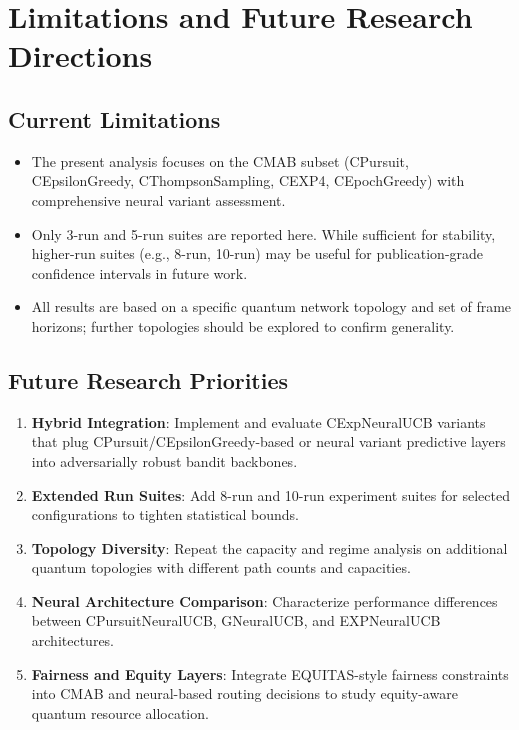 \documentclass[12pt,a4paper]{article}
\begin{document}
\section{Limitations and Future Research Directions}

\subsection{Current Limitations}

\begin{itemize}
\item The present analysis focuses on the CMAB subset (CPursuit, CEpsilonGreedy, CThompsonSampling, CEXP4, CEpochGreedy) with comprehensive neural variant assessment.
\item Only 3-run and 5-run suites are reported here. While sufficient for stability, higher-run suites (e.g., 8-run, 10-run) may be useful for publication-grade confidence intervals in future work.
\item All results are based on a specific quantum network topology and set of frame horizons; further topologies should be explored to confirm generality.
\end{itemize}

\subsection{Future Research Priorities}

\begin{enumerate}
\item \textbf{Hybrid Integration}: Implement and evaluate CExpNeuralUCB variants that plug CPursuit/CEpsilonGreedy-based or neural variant predictive layers into adversarially robust bandit backbones.
\item \textbf{Extended Run Suites}: Add 8-run and 10-run experiment suites for selected configurations to tighten statistical bounds.
\item \textbf{Topology Diversity}: Repeat the capacity and regime analysis on additional quantum topologies with different path counts and capacities.
\item \textbf{Neural Architecture Comparison}: Characterize performance differences between CPursuitNeuralUCB, GNeuralUCB, and EXPNeuralUCB architectures.
\item \textbf{Fairness and Equity Layers}: Integrate EQUITAS-style fairness constraints into CMAB and neural-based routing decisions to study equity-aware quantum resource allocation.
\end{enumerate}
\end{document}
